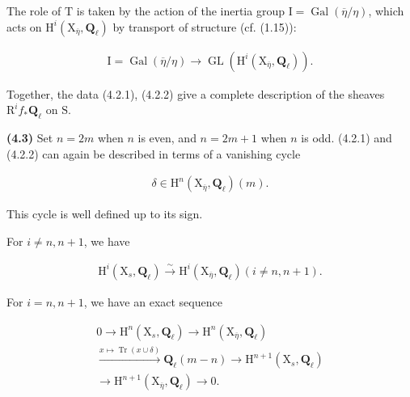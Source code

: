\documentclass[10pt,leqno]{article}
\begin{document}
\noindent The role of \(\mathrm{T}\) is taken by the action of the inertia group \(\mathrm{I}=\operatorname{Gal}(\overline{\eta }/\eta )\), which acts on \(\mathrm{H}^{i}(\mathrm{X}_{\overline{\eta }},\mathbf{Q}_{\ell })\) by transport of structure (cf. (1.15)):\par

\begin{equation*}\begin{gathered}\mathrm{I}=\operatorname{Gal}(\overline{\eta }/\eta ) \longrightarrow  \operatorname{GL}(\mathrm{H}^{i}(\mathrm{X}_{\overline{\eta }},\mathbf{Q}_{\ell })).\end{gathered}\tag{4.2.2}\end{equation*}

\noindent Together, the data (4.2.1), (4.2.2) give a complete description of the sheaves \(\mathrm{R}^{i} f_{*}\mathbf{Q}_{\ell }\) on \(\mathrm{S}\).\par

\noindent \textbf{(4.3)} Set \(n=2m\) when \(n\) is even, and \(n=2m+1\) when \(n\) is odd. (4.2.1) and (4.2.2) can again be described in terms of a vanishing cycle\par

\begin{equation*}\begin{gathered}\delta \in \mathrm{H}^{n}(\mathrm{X}_{\overline{\eta }},\mathbf{Q}_{\ell })(m).\end{gathered}\tag{4.3.1}\end{equation*}

\noindent This cycle is well defined up to its sign.\par

\noindent For \(i\ne n,n+1\), we have\par

\begin{equation*}\begin{gathered}\mathrm{H}^{i}(\mathrm{X}_{s},\mathbf{Q}_{\ell }) \xrightarrow{\sim } \mathrm{H}^{i}(\mathrm{X}_{\overline{\eta }},\mathbf{Q}_{\ell })    (i\ne n,n+1).\end{gathered}\tag{4.3.2}\end{equation*}

\noindent For \(i=n,n+1\), we have an exact sequence\par

\begin{equation*}\begin{gathered}0 \longrightarrow  \mathrm{H}^{n}(\mathrm{X}_{s},\mathbf{Q}_{\ell }) \longrightarrow  \mathrm{H}^{n}(\mathrm{X}_{\overline{\eta }},\mathbf{Q}_{\ell }) \\ \xrightarrow{x\longmapsto \operatorname{Tr}(x\cup \delta )} \mathbf{Q}_{\ell }(m- n) \longrightarrow  \mathrm{H}^{n+1}(\mathrm{X}_{s},\mathbf{Q}_{\ell }) \\ \longrightarrow  \mathrm{H}^{n+1}(\mathrm{X}_{\overline{\eta }},\mathbf{Q}_{\ell }) \longrightarrow  0.\end{gathered}\tag{4.3.3}\end{equation*}
\end{document}
